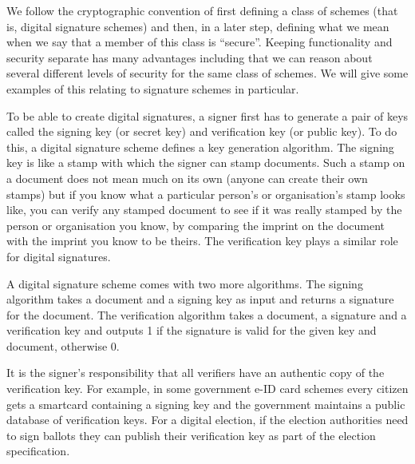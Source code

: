 \documentclass[envcountsame]{llncs}
\begin{document}
We follow the cryptographic convention of first defining a class of schemes
(that is, digital signature schemes) and then, in a later step, defining what we
mean when we say that a member of this class is ``secure''. Keeping
functionality and security separate has many advantages including that we can
reason about several different levels of security for the same class of schemes.
We will give some examples of this relating to signature schemes in particular.

To be able to create digital signatures, a signer first has to generate a pair
of keys called the signing key (or secret key) and verification key (or public
key). To do this, a digital signature scheme defines a key generation algorithm.
The signing key is like a stamp with which the signer can stamp documents. Such
a stamp on a document does not mean much on its own (anyone can create their own
stamps) but if you know what a particular person's or organisation's stamp looks
like, you can verify any stamped document to see if it was really stamped by the
person or organisation you know, by comparing the imprint on the document with
the imprint you know to be theirs. The verification key plays a similar role for
digital signatures.

A digital signature scheme comes with two more algorithms. The signing algorithm
takes a document and a signing key as input and returns a signature for the
document. The verification algorithm takes a document, a signature and a
verification key and outputs 1 if the signature is valid for the given key and
document, otherwise 0.

It is the signer's responsibility that all verifiers have an authentic copy of
the verification key. For example, in some government e-ID card schemes every
citizen gets a smartcard containing a signing key and the government maintains a
public database of verification keys. For a digital election, if the election
authorities need to sign ballots they can publish their verification key as part
of the election specification.
\end{document}
